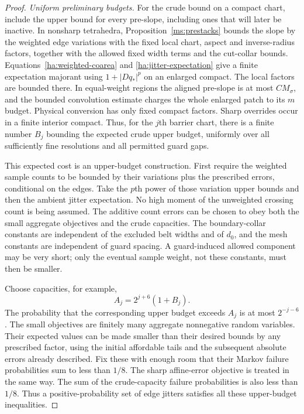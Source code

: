 \begin{proof}
\emph{Uniform preliminary budgets.}
For the crude bound on a compact chart, include the upper bound for
every pre-slope, including ones that will later be inactive.
In nonsharp tetrahedra,
Proposition~\ref{ms:prestacks} bounds the slope by the weighted edge
variations with the fixed local chart, aspect and inverse-radius
factors, together with the allowed fixed width terms and the
cut-collar bounds.  Equations~\eqref{ha:weighted-coarea} and
\eqref{ha:jitter-expectation} give a finite expectation majorant
using $1+|Dq_*|^p$ on an enlarged compact.  The local factors are
bounded there.  In equal-weight regions the aligned pre-slope is
at most $CM_\sigma$, and the bounded convolution estimate charges
the whole enlarged patch to its $m$ budget.  Physical conversion
has only fixed compact factors.  Sharp overrides occur in a finite
interior compact.  Thus, for the $j$th barrier chart, there is a
finite number $B_j$ bounding the expected crude upper budget, uniformly
over all sufficiently fine resolutions and all permitted guard
gaps.

This expected cost is an upper-budget construction.  First require
the weighted sample counts to be bounded by their variations plus
the prescribed errors, conditional on the edges.  Take the $p$th
power of those variation upper bounds and then the ambient jitter
expectation.  No high moment of the unweighted crossing count is
being assumed.  The additive count errors can be chosen to obey
both the small aggregate objectives and the crude capacities.
The boundary-collar constants are independent of the excluded belt
widths and of $d_0$, and the mesh constants are independent of guard
spacing.  A guard-induced allowed component may be very short;
only the eventual sample weight, not these constants, must then
be smaller.

Choose capacities, for example,
\[
                            A_j=2^{j+6}(1+B_j).
\]
The probability that the corresponding upper budget exceeds $A_j$
is at most $2^{-j-6}$.  The small objectives are finitely many
aggregate nonnegative random variables.  Their expected values
can be made smaller than their desired bounds by any prescribed
factor, using the initial affordable tails and the subsequent
absolute errors already described.  Fix these with enough room
that their Markov failure probabilities sum to less than $1/8$.
The sharp affine-error objective is treated in the same way.
The sum of the crude-capacity failure probabilities is also less
than $1/8$.  Thus a positive-probability set of edge jitters
satisfies all these upper-budget inequalities.


\end{proof}
